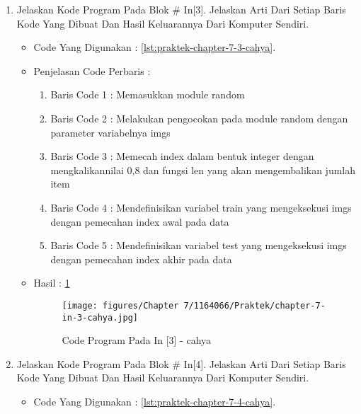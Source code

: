\begin{enumerate}
\item Jelaskan Kode Program Pada Blok \# In[3]. Jelaskan Arti Dari Setiap Baris Kode Yang Dibuat Dan Hasil Keluarannya Dari Komputer Sendiri.
\begin{itemize}
\item Code Yang Digunakan : \ref{lst:praktek-chapter-7-3-cahya}.

\par
\par
\item Penjelasan Code Perbaris	: 
\begin{enumerate}
\item Baris Code 1	: Memasukkan  module random
\item Baris Code 2	: Melakukan pengocokan pada module random dengan parameter variabelnya imgs
\item Baris Code 3	: Memecah index dalam bentuk integer dengan mengkalikannilai 0,8 dan fungsi len yang akan mengembalikan jumlah item
\item Baris Code 4	: Mendefinisikan variabel train yang mengeksekusi imgs dengan pemecahan index awal pada data
\item Baris Code 5	: Mendefinisikan variabel test yang mengeksekusi imgs dengan pemecahan index akhir pada data
\end{enumerate}
\par
\item Hasil : \ref{chapter-7-in-3-cahya}
\par
\par
\begin{figure}[!hbtp]
\centering
\texttt{[image: figures/Chapter 7/1164066/Praktek/chapter-7-in-3-cahya.jpg]}
\caption{Code Program Pada In [3] - cahya}
\label{chapter-7-in-3-cahya}
\end{figure}
\par
\par
\end{itemize}
\par
\par
\par
\item Jelaskan Kode Program Pada Blok \# In[4]. Jelaskan Arti Dari Setiap Baris Kode Yang Dibuat Dan Hasil Keluarannya Dari Komputer Sendiri.
\begin{itemize}
\item Code Yang Digunakan : \ref{lst:praktek-chapter-7-4-cahya}.

\end{itemize}
\end{enumerate}
